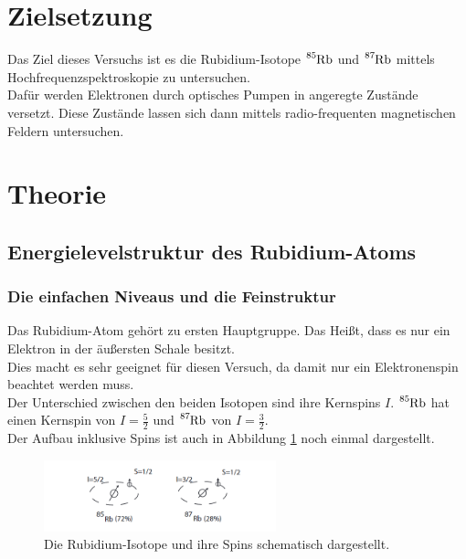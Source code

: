 \section{Zielsetzung}
    Das Ziel dieses Versuchs ist es die Rubidium-Isotope $\ce{^{85}Rb}$ und $\ce{^{87}Rb}$ mittels Hochfrequenzspektroskopie zu untersuchen.\\
    Dafür werden Elektronen durch optisches Pumpen in angeregte Zustände versetzt. Diese Zustände lassen sich dann mittels radio-frequenten magnetischen Feldern untersuchen.
\section{Theorie}

\subsection{Energielevelstruktur des Rubidium-Atoms}


\subsubsection{Die einfachen Niveaus und die Feinstruktur}
\noindent
Das Rubidium-Atom gehört zu ersten Hauptgruppe. Das Heißt, dass es nur ein Elektron in der äußersten Schale besitzt.\\
Dies macht es sehr geeignet für diesen Versuch, da damit nur ein Elektronenspin beachtet werden muss.\\
Der Unterschied zwischen den beiden Isotopen sind ihre Kernspins $I$. 
$\ce{^{85}Rb}$ hat einen Kernspin von $I = \frac{5}{2}$ und $\ce{^{87}Rb}$ von $I = \frac{3}{2}$.\\ 
Der Aufbau inklusive Spins ist auch in Abbildung \ref{img:Iso} noch einmal dargestellt.

\begin{figure}[H]
    \centering
    \includegraphics[width=0.6\textwidth]{latex/images/Isotopes.PNG}
    \caption{Die Rubidium-Isotope und ihre Spins schematisch dargestellt\protect \cite{pump_1}.}
    \label{img:Iso}
\end{figure}

